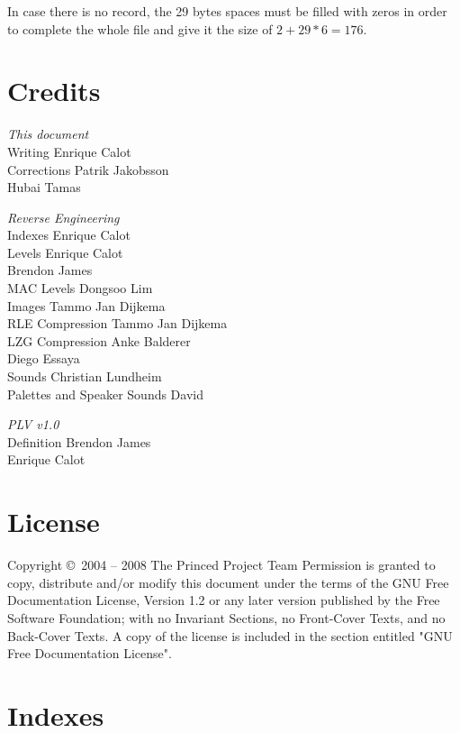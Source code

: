 \documentclass{article}
\begin{document}
 In case there is no record, the 29 bytes spaces must be filled with zeros
 in order to complete the whole file and give it the size of $2+29*6 = 176$.

\pagebreak[3]
\section{Credits}
\begin{center}
\parbox{11.6cm}{
\raggedright {\it This document} \\
  Writing                     \dotfill Enrique Calot \\
  Corrections                 \dotfill Patrik Jakobsson \\
                           \raggedleft Hubai Tamas \\ 
\bigskip
\pagebreak[2]
\raggedright {\it Reverse Engineering} \\
  Indexes                     \dotfill Enrique Calot \\
  Levels                      \dotfill Enrique Calot \\
                           \raggedleft Brendon James \\
  MAC Levels                  \dotfill Dongsoo Lim \\
  Images                      \dotfill Tammo Jan Dijkema \\
  RLE Compression             \dotfill Tammo Jan Dijkema \\
  LZG Compression             \dotfill Anke Balderer \\
                           \raggedleft Diego Essaya \\
  Sounds                      \dotfill Christian Lundheim \\
  Palettes and Speaker Sounds \dotfill David \\
\bigskip
\pagebreak[2]
\raggedright {\it PLV v1.0} \\
  Definition                  \dotfill Brendon James \\
                           \raggedleft Enrique Calot \\
}
\end{center}

\pagebreak[3]
\section{License}

      Copyright \copyright \ 2004 -- 2008 The Princed Project Team
\bigskip
      Permission is granted to copy, distribute and/or modify this document
      under the terms of the GNU Free Documentation License, Version 1.2
      or any later version published by the Free Software Foundation;
      with no Invariant Sections, no Front-Cover Texts, and no Back-Cover
      Texts.  A copy of the license is included in the section entitled
      "GNU Free Documentation License".

\section*{Indexes}
\listoftables
\listoffigures
\printindex

\end{document}
